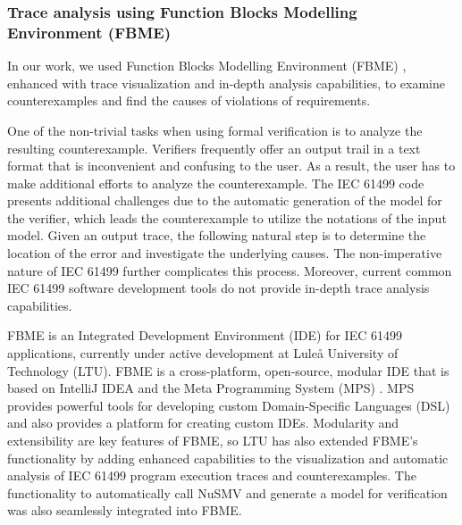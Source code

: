 \documentclass{ieeeojies}
\begin{document}
\subsubsection*{Trace analysis using Function Blocks Modelling Environment (FBME)}
In our work, we used Function Blocks Modelling Environment (FBME) \cite{FBME}, enhanced with trace visualization and in-depth analysis capabilities, to examine counterexamples and find the causes of violations of requirements. 

One of the non-trivial tasks when using formal verification is to analyze the resulting counterexample. Verifiers frequently offer an output trail in a text format that is inconvenient and confusing to the user. As a result, the user has to make additional efforts to analyze the counterexample. 
The IEC 61499 code presents additional challenges due to the automatic generation of the model for the verifier, which leads the counterexample to utilize the notations of the input model. 
Given an output trace, the following natural step is to determine the location of the error and investigate the underlying causes. The non-imperative nature of IEC 61499 further complicates this process. Moreover, current common IEC 61499 software development tools do not provide in-depth trace analysis capabilities. 

FBME is an Integrated Development Environment (IDE) for IEC 61499 applications, currently under active development at Luleå University of Technology (LTU). FBME is a cross-platform, open-source, modular IDE that is based on IntelliJ IDEA and the Meta Programming System (MPS) \cite{mps}. MPS provides powerful tools for developing custom Domain-Specific Languages (DSL) and also provides a platform for creating custom IDEs. Modularity and extensibility are key features of FBME, so LTU has also extended FBME's functionality by adding enhanced capabilities to the visualization and automatic analysis of IEC 61499 program execution traces and counterexamples. 
The functionality to automatically call NuSMV and generate a model for verification was also seamlessly integrated into FBME.

\newpage
\end{document}
